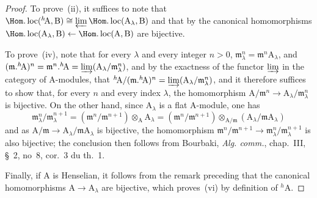 \begin{proof}
To prove~(ii), it suffices to note that $\Hom.\operatorname{loc}({}^h\!\mathrm{A},\mathrm{B})\cong\varprojlim\Hom.\operatorname{loc}(\mathrm{A}_\lambda,\mathrm{B})$ and that by  the canonical homomorphisms $\Hom.\operatorname{loc}(\mathrm{A}_\lambda,\mathrm{B})\leftarrow\Hom.\operatorname{loc}(\mathrm{A},\mathrm{B})$ are bijective.

To prove~(iv), note that for every $\lambda$ and every integer $n>0$, $\mathfrak{m}_\lambda^n=\mathfrak{m}^n\mathrm{A}_\lambda$, and $(\mathfrak{m}.{}^h\!\mathrm{A})^n=\mathfrak{m}^n.{}^h\!\mathrm{A}=\varinjlim(\mathrm{A}_\lambda/\mathfrak{m}_\lambda^n)$, and by the exactness of the functor $\varinjlim$ in the category of A-modules, that ${}^h\!\mathrm{A}/(\mathfrak{m}.{}^h\!\mathrm{A})^n=\varinjlim(\mathrm{A}_\lambda/\mathfrak{m}_\lambda^n)$, and it therefore suffices to show that, for every $n$ and every index $\lambda$, the homomorphism $\mathrm{A}/\mathfrak{m}^n\to\mathrm{A}_\lambda/\mathfrak{m}_\lambda^n$ is bijective.
On the other hand, since $\mathrm{A}_\lambda$ is a flat A-module, one has
\[
  \mathfrak{m}_\lambda^n/\mathfrak{m}_\lambda^{n+1}=(\mathfrak{m}^n/\mathfrak{m}^{n+1})\otimes_{\mathrm{A}}\mathrm{A}_\lambda
  =(\mathfrak{m}^n/\mathfrak{m}^{n+1})\otimes_{\mathrm{A}/\mathfrak{m}}(\mathrm{A}_\lambda/\mathfrak{m}\mathrm{A}_\lambda)
\]
and as $\mathrm{A}/\mathfrak{m}\to\mathrm{A}_\lambda/\mathfrak{m}\mathrm{A}_\lambda$ is bijective, the homomorphism $\mathfrak{m}^n/\mathfrak{m}^{n+1}\to\mathfrak{m}_\lambda^n/\mathfrak{m}_\lambda^{n+1}$ is also bijective;
the conclusion then follows from Bourbaki, \emph{Alg. comm.}, chap.~III, \S~2, no~8, cor.~3 du th.~1.

Finally, if A is Henselian, it follows from the remark preceding  that the canonical homomorphisms $\mathrm{A}\to\mathrm{A}_\lambda$ are bijective, which proves~(vi) by definition of ${}^h\!\mathrm{A}$.
\end{proof}

